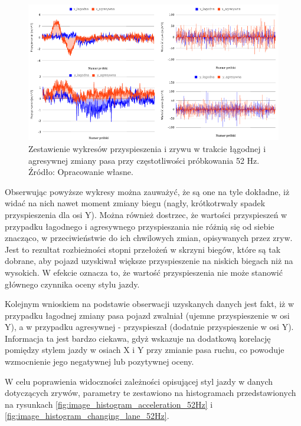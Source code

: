 \begin{figure}[H]
	\centering
	\includegraphics[width=16cm]{img/driving_analysis/zestawienie_ostra_lagodna.png}
	\caption{Zestawienie wykresów przyspieszenia i zrywu w trakcie łągodnej i agresywnej zmiany pasa przy częstotliwości próbkowania 52 Hz.
	\\Źródło: Opracowanie własne.}
	\label{fig:image_driving_analysis_test_acc_light_hard_lane_52Hz}
\end{figure}

Obserwując powyższe wykresy można zauważyć, że są one na tyle dokładne, iż widać na nich nawet moment zmiany biegu (nagły, krótkotrwały spadek przyspieszenia dla osi Y). Można również dostrzec, że wartości przyspieszeń w przypadku łagodnego i agresywnego przyspieszania nie różnią się od siebie znacząco, w przeciwieństwie do ich chwilowych zmian, opisywanych przez zryw. Jest to rezultat rozbieżności stopni przełożeń w skrzyni biegów, które są tak dobrane, aby pojazd uzyskiwał większe przyspieszenie na niskich biegach niż na wysokich. W efekcie oznacza to, że wartość przyspieszenia nie może stanowić głównego czynnika oceny stylu jazdy.

Kolejnym wnioskiem na podstawie obserwacji uzyskanych danych jest fakt, iż w przypadku łagodnej zmiany pasa pojazd zwalniał (ujemne przyspieszenie w osi Y), a w przypadku agresywnej - przyspieszał (dodatnie przyspieszenie w osi Y). Informacja ta jest bardzo ciekawa, gdyż wskazuje na dodatkową korelację pomiędzy stylem jazdy w osiach X i Y przy zmianie pasa ruchu, co powoduje wzmocnienie jego negatywnej lub pozytywnej oceny.

W celu poprawienia widoczności zależności opisującej styl jazdy w danych dotyczących zrywów, parametry te zestawiono na histogramach przedstawionych na rysunkach \ref{fig:image_histogram_acceleration_52Hz} i \ref{fig:image_histogram_changing_lane_52Hz}.

